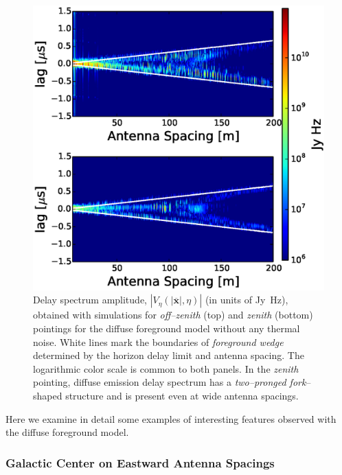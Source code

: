 \documentclass[preprint2,iop,numberedappendix]{emulateapj}
\begin{document}
\begin{figure}[htb]
\centering
\includegraphics[width=\linewidth]{figures/v1_0/delta_array_multi_baseline_CLEAN_noiseless_visibilities_0.3m_ground_custom_gaussian_FG_model_dsm_all_sky_nside_64_Tsys_90.0K_185.0_MHz_30.7_MHz_bnw2.0.eps}
\caption{Delay spectrum amplitude, $|V_\eta(|\overline{\mathbf{x}}|,\eta)|$ (in units of Jy~Hz), obtained with simulations for {\it off--zenith} (top) and {\it zenith} (bottom) pointings for the diffuse foreground model without any thermal noise. White lines mark the boundaries of {\it foreground wedge} determined by the horizon delay limit and antenna spacing. The logarithmic color scale is common to both panels. In the {\it zenith} pointing, diffuse emission delay spectrum has a {\it two--pronged fork}--shaped structure and is present even at wide antenna spacings. \label{fig:noiseless-dsm-delay-spectrum}}
\end{figure}

Here we examine in detail some examples of interesting features observed with the diffuse foreground model.

\subsubsection{Galactic Center on Eastward Antenna Spacings}\label{sec:GC-east}
\end{document}
